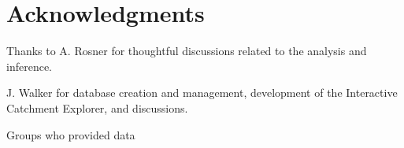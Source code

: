 \documentclass[]{article}
\begin{document}
\section{Acknowledgments}\label{acknowledgments}

Thanks to A. Rosner for thoughtful discussions related to the analysis
and inference.

J. Walker for database creation and management, development of the
Interactive Catchment Explorer, and discussions.

Groups who provided data

\renewcommand\refname{Literature Cited}

\end{document}
